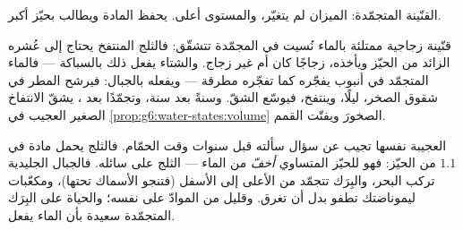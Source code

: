 \begin{omfigure}

{\small القنّينة المتجمّدة: الميزان لم يتغيّر، والمستوى أعلى.
 يحفظ المادة ويطالب بحيّز أكبر.}
\end{omfigure}

\begin{example}\label{ex:g6:water-states:burst}
قنّينة زجاجية ممتلئة بالماء نُسيت في المجمّدة تتشقّق: فالثلج
المنتفخ يحتاج إلى عُشره الزائد من الحيّز ويأخذه، زجاجًا كان أم
غير زجاج. والشتاء يفعل ذلك بالسباكة --- فالماء المتجمّد في
أنبوب يفجّره كما تفجّره مطرقة --- ويفعله بالجبال: فيرشح المطر
في شقوق الصخر،  ليلًا، وينتفخ، فيوسّع الشقّ. وسنةً بعد
سنة، وتجمّدًا بعد ، يشقّ الانتفاخ الصغير العجيب في
\cref{prop:g6:water-states:volume} الصخورَ ويفتّت القمم.
\end{example}

\begin{remark}\label{rem:g6:water-states:floats}
العجيبة نفسها تجيب عن سؤال سألته قبل سنوات وقت الحمّام. فالثلج
يحمل مادة  في $1.1$  من الحيّز: فهو للحيّز المتساوي
\emph{أخفّ} من الماء ---  الثلج على سائله. فالجبال الجليدية
تركب البحر، والبِرَك تتجمّد من الأعلى إلى الأسفل (فتنجو الأسماك
تحتها)، ومكعّبات ليموناضتك تطفو بدل أن تغرق. وقليل من الموادّ
 على نفسه؛ والحياة على البِرَك المتجمّدة سعيدة بأن الماء
يفعل.
\end{remark}

